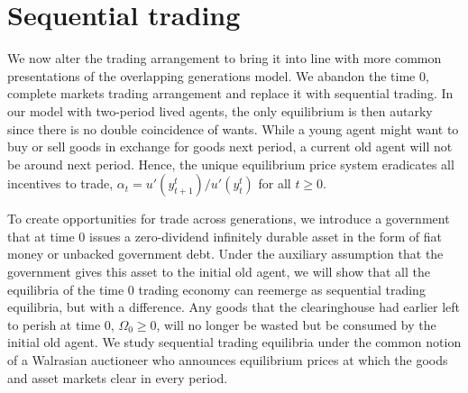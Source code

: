 




\section{Sequential trading}
  We now alter the trading arrangement to bring it
into line with more common presentations of the overlapping
generations model.   We abandon the time $0$, complete markets
 trading  arrangement and replace it with sequential
trading. In our model with two-period lived agents, the 
only equilibrium is then autarky since there is no double
coincidence of wants. While a young agent might want to
buy or sell goods in exchange for 
goods next period, a current old agent will not be
around next period.
Hence, the unique equilibrium price system  eradicates all incentives to trade,
$\alpha_t= u'(y^t_{t+1})/u'(y^t_t)$ for all $t\geq 0$.

To create opportunities for trade across
generations, we introduce a government
that at time $0$ issues a zero-dividend infinitely
durable asset in the form of fiat money or unbacked
government debt. Under the auxiliary assumption 
that the government gives this asset 
to the initial old agent, we will show that all the 
equilibria of the time $0$ trading economy
can reemerge as sequential trading equilibria, but
with a  difference. Any goods that the clearinghouse 
had earlier left to perish at time $0$, 
$\Omega_0\geq 0$, will no longer be wasted but be
consumed by the initial old agent.
We study sequential trading
equilibria under the common
notion of a Walrasian auctioneer who announces
equilibrium prices at which the goods and asset
markets clear in every period.

